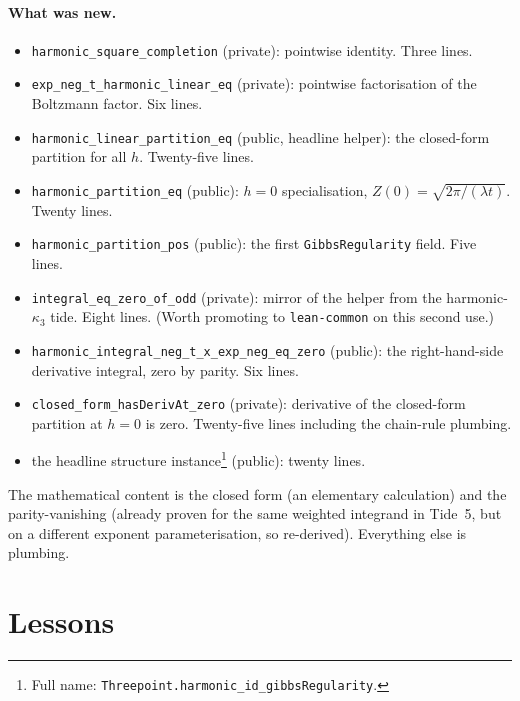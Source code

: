 \documentclass[11pt]{article}
\begin{document}
\paragraph{What was new.}
\begin{itemize}
\item \texttt{harmonic\_square\_completion} (private): pointwise
identity. Three lines.
\item \texttt{exp\_neg\_t\_harmonic\_linear\_eq} (private): pointwise
factorisation of the Boltzmann factor. Six lines.
\item \texttt{harmonic\_linear\_partition\_eq} (public, headline
helper): the closed-form partition for all $h$. Twenty-five lines.
\item \texttt{harmonic\_partition\_eq} (public): $h = 0$
specialisation, $Z(0) = \sqrt{2\pi/(\lambda t)}$. Twenty lines.
\item \texttt{harmonic\_partition\_pos} (public): the first
\texttt{GibbsRegularity} field. Five lines.
\item \texttt{integral\_eq\_zero\_of\_odd} (private): mirror of the
helper from the harmonic-$\kappa_3$ tide. Eight lines. (Worth
promoting to \texttt{lean-common} on this second use.)
\item \texttt{harmonic\_integral\_neg\_t\_x\_exp\_neg\_eq\_zero}
(public): the right-hand-side derivative integral, zero by parity.
Six lines.
\item \texttt{closed\_form\_hasDerivAt\_zero} (private): derivative
of the closed-form partition at $h = 0$ is zero. Twenty-five lines
including the chain-rule plumbing.
\item the headline structure instance\footnote{Full name:
\texttt{Threepoint.harmonic\_id\_gibbsRegularity}.} (public): twenty
lines.
\end{itemize}

The mathematical content is the closed form (an elementary
calculation) and the parity-vanishing (already proven for the same
weighted integrand in Tide~5, but on a different exponent
parameterisation, so re-derived). Everything else is plumbing.

\section{Lessons}
\end{document}
